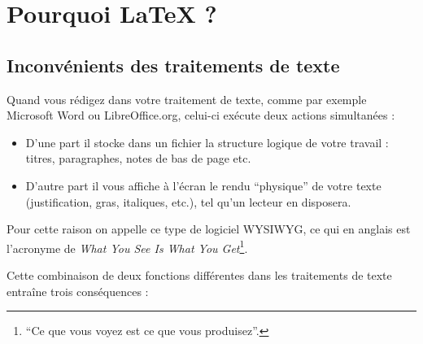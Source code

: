 \section{Pourquoi \LaTeX{} ?}

\subsection{Inconvénients des traitements de texte}

Quand vous rédigez dans votre traitement de texte, comme par exemple Microsoft Word ou LibreOffice.org, celui-ci exécute deux actions simultanées :

\begin{itemize}
\item D'une part il stocke dans un fichier la structure logique de votre travail : titres, paragraphes, notes de bas de page etc.
\item D'autre part il vous affiche à l'écran le rendu \enquote{physique} de votre texte (justification, gras, italiques, etc.), tel qu'un lecteur en disposera.
\end{itemize}

Pour cette raison on appelle ce type de logiciel WYSIWYG, ce qui en anglais est l'acronyme de  \textenglish{\emph{What You See Is What You Get}}\footnote{\enquote{Ce que vous voyez est ce que vous produisez}.}. 

Cette combinaison de deux fonctions différentes dans les  traitements de texte entraîne trois conséquences :


